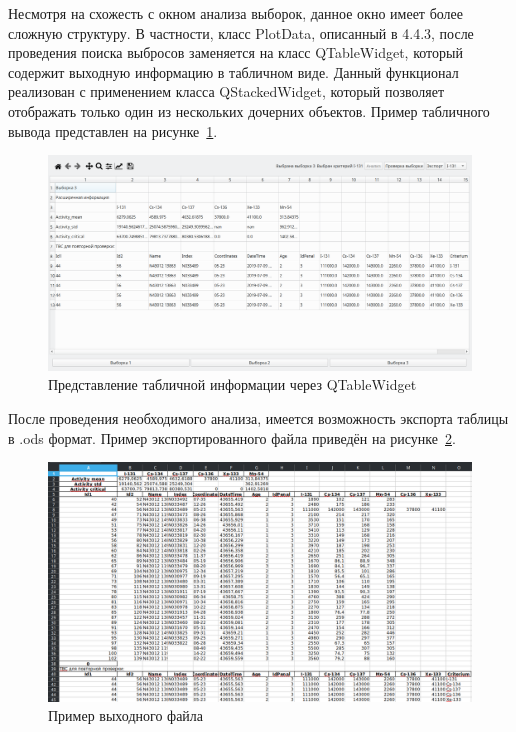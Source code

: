 Несмотря на схожесть с окном анализа выборок, данное окно имеет более сложную структуру. В частности, класс PlotData, описанный в 4.4.3, после проведения поиска выбросов заменяется на класс QTableWidget, который содержит выходную информацию в табличном виде. Данный функционал реализован с применением класса QStackedWidget, который позволяет отображать только один из нескольких дочерних объектов. Пример табличного вывода представлен на рисунке~\ref{fig:ris14}.

\begin{figure}[H]
	\centering
	\includegraphics[width=1\linewidth]{pics/ris14} %
	\caption{Представление табличной информации через QTableWidget}
	\label{fig:ris14} %
\end{figure}

После проведения необходимого анализа, имеется возможность экспорта таблицы в .ods формат. Пример экспортированного файла приведён на рисунке~\ref{fig:ris12}.

\begin{figure}[H]
	\centering
	\includegraphics[width=1\linewidth]{pics/ris12} %
	\caption{Пример выходного файла}
	\label{fig:ris12} %
\end{figure}

